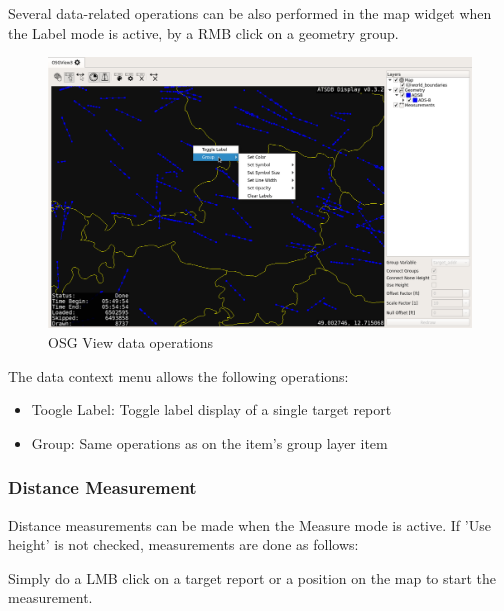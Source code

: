 {Several data-related operations can be also performed in the map widget when the Label mode is active, by a RMB click on a geometry group.


\begin{figure}[H]
    \hspace*{-2cm}
    \includegraphics[width=18cm,frame]{../screenshots/osgview_data_operations.png}
  \caption{OSG View data operations}
\end{figure}

The data context menu allows the following operations:

\begin{itemize}
 \item Toogle Label: Toggle label display of a single target report
 \item Group: Same operations as on the item's group layer item
\end{itemize}

\subsubsection{Distance Measurement}

Distance measurements can be made when the Measure mode is active. If 'Use height' is not checked, measurements are done as follows:

Simply do a LMB click on a target report or a position on the map to start the measurement.

}
